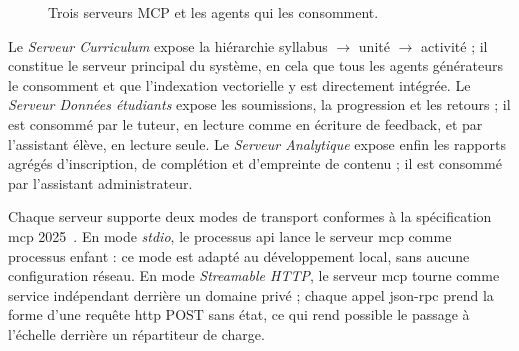 \begin{figure}[H]
\centering
{}
\caption{Trois serveurs MCP et les agents qui les consomment.}
\label{fig:mcp-servers}
\end{figure}

Le \emph{Serveur Curriculum} expose la hiérarchie syllabus
$\rightarrow$ unité $\rightarrow$ activité ; il constitue le serveur
principal du système, en cela que tous les agents générateurs le
consomment et que l'indexation vectorielle y est directement
intégrée. Le \emph{Serveur Données étudiants} expose les
soumissions, la progression et les retours ; il est consommé par le
tuteur, en lecture comme en écriture de feedback, et par
l'assistant élève, en lecture seule. Le \emph{Serveur Analytique}
expose enfin les rapports agrégés d'inscription, de complétion et
d'empreinte de contenu ; il est consommé par l'assistant
administrateur.

Chaque serveur supporte deux modes de transport conformes à la
spécification \gls{mcp} 2025~\cite{mcpspec}. En mode \emph{stdio},
le processus \gls{api} lance le serveur \gls{mcp} comme processus
enfant : ce mode est adapté au développement local, sans aucune
configuration réseau. En mode \emph{Streamable HTTP}, le serveur
\gls{mcp} tourne comme service indépendant derrière un domaine
privé ; chaque appel \gls{json}-\gls{rpc} prend la forme d'une
requête \gls{http} POST sans état, ce qui rend possible le passage
à l'échelle derrière un répartiteur de charge.

